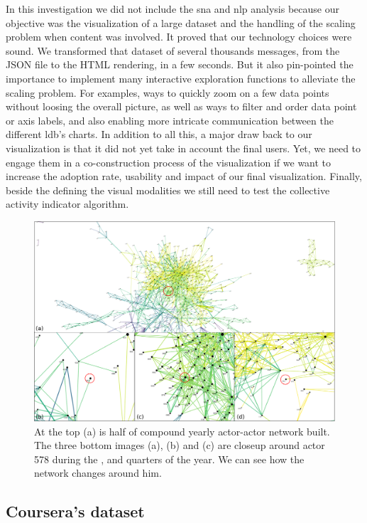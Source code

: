 \documentclass[a4paper,twoside]{article}
\begin{document}
In this investigation we did not include the \gls{sna} and \gls{nlp} analysis because our objective was the visualization of a large dataset and the handling of the scaling problem when content was involved.  It proved that our technology choices were sound. We transformed that dataset of several thousands messages,  from the JSON file to the HTML rendering, in a few seconds.
But it also pin-pointed the importance to implement many interactive exploration functions to alleviate the scaling problem.  For examples, ways to quickly zoom on a few data points without loosing the overall picture, as well as ways to filter and order data point or axis labels, and also enabling more intricate communication between the different \gls{ldb}'s charts.
In addition to all this, a major draw back to our visualization is that it did not yet take in account the final users.  Yet, we need to engage them in a co-construction process of the visualization if we want to increase the adoption rate, usability and impact of our final visualization.
Finally, beside the defining the visual modalities we still need to test the collective activity indicator algorithm.

\begin{figure}[t]
  \centering
  \includegraphics[width=\textwidth]{images/evolution.png}
  \small{
    \caption{\label{fig:evolution}
      At the top (a) is half of compound yearly actor-actor network built.  The three bottom images (a), (b) and (c) are closeup around actor 578 during the ,  and  quarters of the year.  We can see how the network changes around him.  }}
\end{figure}

\subsection{Coursera's dataset}
\end{document}
